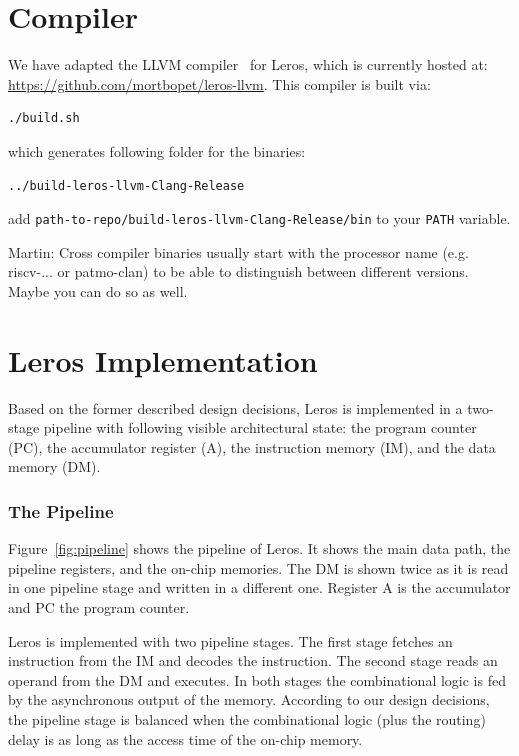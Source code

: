 \documentclass[a4paper,fontsize=10pt,twoside,DIV15,BCOR12mm,headinclude=true,footinclude=false,pagesize,bibtotoc]{scrbook}
\newcommand{\code}[1]{{\small{\texttt{#1}}}}
\newcommand{\martin}[1]{{\color{blue} Martin: #1}}
\begin{document}
\chapter{Compiler}

We have adapted the LLVM compiler~\cite{llvm:2004} for Leros, which is currently hosted at:
\url{https://github.com/mortbopet/leros-llvm}. This compiler is built via:

\begin{verbatim}
./build.sh
\end{verbatim}

which generates following folder for the binaries:

\begin{verbatim}
../build-leros-llvm-Clang-Release
\end{verbatim}

add \code{path-to-repo/build-leros-llvm-Clang-Release/bin} to your \code{PATH} variable.

\martin{Cross compiler binaries usually start with the processor name (e.g. riscv-... or patmo-clan)
to be able to distinguish between different versions. Maybe you can do so as well.}

\chapter{Leros Implementation}
\label{sec:imp}

Based on the former described design decisions, Leros is implemented in a two-stage pipeline with following visible architectural state: the program counter (PC), the accumulator register (A), the instruction memory (IM), and the data memory (DM).

\subsection{The Pipeline}

Figure~\ref{fig:pipeline} shows the pipeline of Leros. It shows the main data path, the pipeline registers, and the on-chip memories. The DM is shown twice as it is read in one pipeline stage and written in a different one. Register A is the accumulator and PC the program counter.

Leros is implemented with two pipeline stages. The first stage fetches an instruction from the IM and decodes the instruction. The second stage reads an operand from the DM and executes. In both stages the combinational logic is fed by the asynchronous output of the memory. According to our design decisions, the pipeline stage is balanced when the combinational logic (plus the routing) delay is as long as the access time of the on-chip memory.
\end{document}

